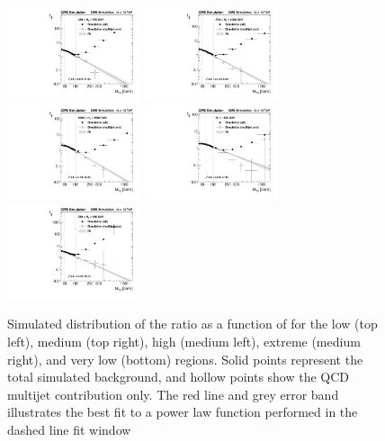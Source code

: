 \begin{figure}
	\centering
	\includegraphics[width=0.35\textwidth]{backgrounds/figs/ratio_HT450to575_j2toInf_b0toInf}
	\includegraphics[width=0.35\textwidth]{backgrounds/figs/ratio_HT575to1000_j2toInf_b0toInf}
	\includegraphics[width=0.35\textwidth]{backgrounds/figs/ratio_HT1000to1500_j2toInf_b0toInf}
	\includegraphics[width=0.35\textwidth]{backgrounds/figs/ratio_HT1500toInf_j2toInf_b0toInf}
	\includegraphics[width=0.35\textwidth]{backgrounds/figs/ratio_HT250to450_j2toInf_b0toInf}
	\caption{Simulated distribution of the \rphi ratio as a function of \mttwo for the low (top left), medium (top right), high (medium left), extreme (medium right), and very low (bottom) \HT regions. Solid points represent the total simulated background, and hollow points show the QCD multijet contribution only. The red line and grey error band illustrates the best fit to a power law function performed in the dashed line fit window}
	\label{fig:rphiDependence}
\end{figure}

